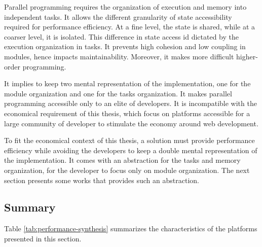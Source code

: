 Parallel programming requires the organization of execution and memory into independent tasks.
It allows the different granularity of state accessibility required for performance efficiency.
At a fine level, the state is shared, while at a coarser level, it is isolated.
This difference in state access id dictated by the execution organization in tasks.
It prevents high cohesion and low coupling in modules, hence impacts maintainability.
Moreover, it makes more difficult higher-order programming.

It implies to keep two mental representation of the implementation, one for the module organization and one for the tasks organization.
It makes parallel programming accessible only to an elite of developers.
It is incompatible with the economical requirement of this thesis, which focus on platforms accessible for a large community of developer to stimulate the economy around web development.

To fit the economical context of this thesis, a solution must provide performance efficiency while avoiding the developers to keep a double mental representation of the implementation.
It comes with an abstraction for the tasks and memory organization, for the developer to focus only on module organization.
The next section presents some works that provides such an abstraction.



\subsection{Summary} \label{chapter3:software-performance:summary}

Table \ref{tab:performance-synthesis} summarizes the characteristics of the platforms presented in this section.


\endinput







